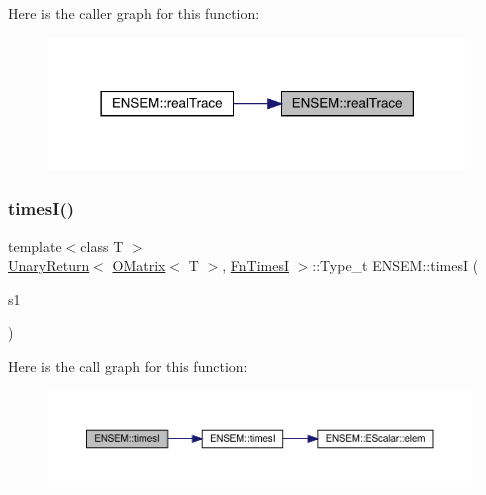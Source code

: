 Here is the caller graph for this function\+:\nopagebreak
\begin{figure}[H]
\begin{center}
\leavevmode
\includegraphics[width=314pt]{d8/d55/group__obsmatrix_gab3988428b88d3b56d2f959c536ec7d2a_icgraph}
\end{center}
\end{figure}
\mbox{\label{group__obsmatrix_ga988cbbcb7d182905bfc7bf8cda7543cf}} 
\subsubsection{\texorpdfstring{timesI()}{timesI()}}
{\footnotesize\ttfamily template$<$class T $>$ \\
\mbox{\hyperlink{structENSEM_1_1UnaryReturn}{Unary\+Return}}$<$ \mbox{\hyperlink{classENSEM_1_1OMatrix}{O\+Matrix}}$<$ T $>$, \mbox{\hyperlink{structENSEM_1_1FnTimesI}{Fn\+TimesI}} $>$\+::Type\+\_\+t E\+N\+S\+E\+M\+::timesI (\begin{DoxyParamCaption}\item[{const \mbox{\hyperlink{classENSEM_1_1OMatrix}{O\+Matrix}}$<$ T $>$ \&}]{s1 }\end{DoxyParamCaption})\hspace{0.3cm}{\ttfamily [inline]}}

Here is the call graph for this function\+:\nopagebreak
\begin{figure}[H]
\begin{center}
\leavevmode
\includegraphics[width=350pt]{d8/d55/group__obsmatrix_ga988cbbcb7d182905bfc7bf8cda7543cf_cgraph}
\end{center}
\end{figure}
\mbox{\label{group__obsmatrix_ga2c4879d53ca01a4233b94574e3c93b4f}} 
